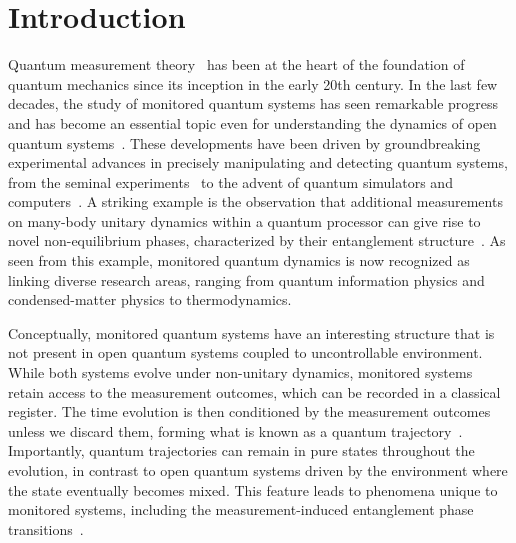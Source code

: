 \documentclass[preprint,pteplogo]{ptephy_v2}%
\numberwithin{equation}{section}
\theoremstyle{definition}
\begin{document}
\maketitle

\tableofcontents

\section{Introduction}
Quantum measurement theory~\cite{von2018mathematical, peres2002quantum, braginsky1995quantum, nielsen2010quantum} has been at the heart of the foundation of quantum mechanics since its inception in the early 20th century.
In the last few decades, the study of monitored quantum systems has seen remarkable progress and has become an essential topic even for understanding the dynamics of open quantum systems~\cite{breuer2002theory, rivas2012open, wiseman2009quantum}.
These developments have been driven by groundbreaking experimental advances in precisely manipulating and detecting quantum systems, from the seminal experiments~\cite{nagourney1986shelved, sauter1986observation, bergquist1986observation} to the advent of quantum simulators and computers~\cite{barreiro2011open, georgescu2014quantum, altman2021quantum, harrington2022engineered}.
A striking example is the observation that additional measurements on many-body unitary dynamics within a quantum processor can give rise to novel non-equilibrium phases, characterized by their entanglement structure~\cite{koh2023measurement, Hoke23}. 
As seen from this example, monitored quantum dynamics is now recognized as linking diverse research areas, ranging from quantum information physics and condensed-matter physics to thermodynamics.

Conceptually, monitored quantum systems have an interesting structure that is not present in open quantum systems coupled to uncontrollable environment.
While both systems evolve under non-unitary dynamics, monitored systems retain access to the measurement outcomes, which can be recorded in a classical register.
The time evolution is then conditioned by the measurement outcomes unless we discard them, forming what is known as a quantum trajectory~\cite{plenio1998quantum, daley2014quantum}.
Importantly, quantum trajectories can remain in pure states throughout the evolution, in contrast to open quantum systems driven by the environment where the state eventually becomes mixed.
This feature leads to  phenomena unique to monitored systems, including the measurement-induced entanglement phase transitions~\cite{Potter2022, Lunt2022Quantum, fisher2023random}.
\end{document}
